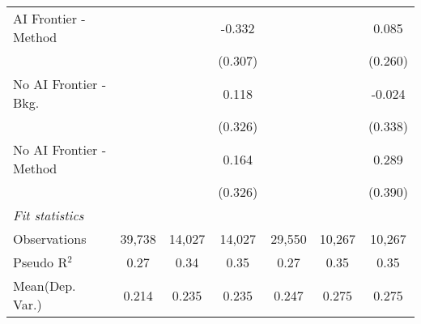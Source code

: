 \begin{tabular}{lcccccc}
   AI Frontier - Method    &              &             & -0.332       &              &              & 0.085\\   
                           &              &             & (0.307)      &              &              & (0.260)\\   
   No AI Frontier - Bkg.   &              &             & 0.118        &              &              & -0.024\\   
                           &              &             & (0.326)      &              &              & (0.338)\\   
   No AI Frontier - Method &              &             & 0.164        &              &              & 0.289\\   
                           &              &             & (0.326)      &              &              & (0.390)\\   
   \midrule
   \emph{Fit statistics}\\
   Observations            & 39,738       & 14,027      & 14,027       & 29,550       & 10,267       & 10,267\\  
   Pseudo R$^2$            & 0.27         & 0.34        & 0.35         & 0.27         & 0.35         & 0.35\\  
Mean(Dep. Var.) & 0.214 & 0.235 & 0.235 & 0.247 & 0.275 & 0.275 \\
   

\end{tabular}
